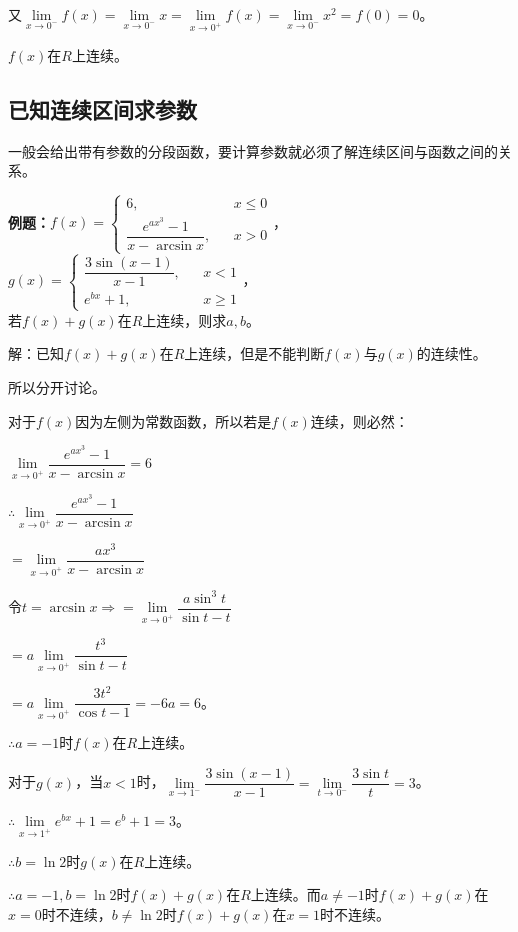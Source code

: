 \documentclass[UTF8, 12pt]{ctexart}
\begin{document}
又$\lim\limits_{x\to 0^-}f(x)=\lim\limits_{x\to 0^-}x=\lim\limits_{x\to 0^+}f(x)=\lim\limits_{x\to 0^-}x^2=f(0)=0$。

$f(x)$在$R$上连续。

\subsection{已知连续区间求参数}

一般会给出带有参数的分段函数，要计算参数就必须了解连续区间与函数之间的关系。

\textbf{例题：}$f(x)=\left\{\begin{array}{lcl}
    6, & & x\leqslant 0 \\
    \dfrac{e^{ax^3}-1}{x-\arcsin x}, & & x>0
\end{array}
\right.$，$g(x)=\left\{\begin{array}{lcl}
    \dfrac{3\sin(x-1)}{x-1}, & & x<1 \\
    e^{bx}+1, & & x\geqslant 1
\end{array}
\right.$，\smallskip \\ 若$f(x)+g(x)$在$R$上连续，则求$a,b$。

解：已知$f(x)+g(x)$在$R$上连续，但是不能判断$f(x)$与$g(x)$的连续性。

所以分开讨论。

对于$f(x)$因为左侧为常数函数，所以若是$f(x)$连续，则必然：\medskip

$\lim\limits_{x\to 0^+}\dfrac{e^{ax^3}-1}{x-\arcsin x}=6$\medskip

$\therefore\lim\limits_{x\to 0^+}\dfrac{e^{ax^3}-1}{x-\arcsin x}$\medskip

$=\lim\limits_{x\to 0^+}\dfrac{ax^3}{x-\arcsin x}$\medskip

$\text{令}t=\arcsin x\Rightarrow=\lim\limits_{x\to 0^+}\dfrac{a\sin^3t}{\sin t-t}$

$=a\lim\limits_{x\to 0^+}\dfrac{t^3}{\sin t-t}$\medskip

$=a\lim\limits_{x\to 0^+}\dfrac{3t^2}{\cos t-1}=-6a=6$。\medskip

$\therefore a=-1$时$f(x)$在$R$上连续。\medskip

对于$g(x)$，当$x<1$时，$\lim\limits_{x\to 1^-}\dfrac{3\sin(x-1)}{x-1}=\lim\limits_{t\to 0^-}\dfrac{3\sin t}{t}=3$。\medskip

$\therefore\lim\limits_{x\to 1^+}e^{bx}+1=e^b+1=3$。\medskip

$\therefore b=\ln 2$时$g(x)$在$R$上连续。\medskip

$\therefore a=-1,b=\ln 2$时$f(x)+g(x)$在$R$上连续。而$a\neq -1$时$f(x)+g(x)$在$x=0$时不连续，$b\neq\ln 2$时$f(x)+g(x)$在$x=1$时不连续。
\end{document}
